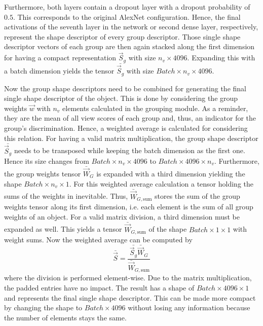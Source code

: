 Furthermore, both layers contain a dropout layer with a dropout probability of $0.5$.
This corresponds to the original AlexNet configuration.
Hence, the final activations of the seventh layer in the network or second dense layer, respectively, represent the shape descriptor of every group descriptor.
Those single shape descriptor vectors of each group are then again stacked along the first dimension for having a compact representation $\vec{S}_g$ with size $n_v \times 4096$.
Expanding this with a batch dimension yields the tensor $\bar{\vec{S}_g}$ with size $Batch \times n_v \times 4096$.

Now the group shape descriptors need to be combined for generating the final single shape descriptor of the object.
This is done by considering the group weights $\vec{w}$ with $n_v$ elements calculated in the grouping module.
As a reminder, they are the mean of all view scores of each group and, thus, an indicator for the group's discrimination.
Hence, a weighted average is calculated for considering this relation.
For having a valid matrix multiplication, the group shape descriptor $\bar{\vec{S}_g}$ needs to be transposed while keeping the batch dimension as the first one.
Hence its size changes from $Batch \times n_v \times 4096$ to $Batch \times 4096 \times n_v$.
Furthermore, the group weights tensor $\bar{\vec{W}}_G$ is expanded with a third dimension yielding the shape $Batch \times n_v \times 1$.
For this weighted average calculation a tensor holding the sums of the weights in inevitable.
Thus, $\bar{\vec{W}}_{G,\text{sum}}$ stores the sum of the group weights tensor along its first dimension, i.e. each element is the sum of all group weights of an object.
For a valid matrix division, a third dimension must be expanded as well.
This yields a tensor $\bar{\vec{W}}_{G,\text{sum}}$ of the shape $Batch \times 1 \times 1$ with weight sums.
Now the weighted average can be computed by
\begin{equation}
	\bar{\vec{S}} = \frac{\bar{\vec{S}_g} \bar{\vec{W}}_G} {\bar{\vec{W}}_{G,\text{sum}}}
\end{equation}
where the division is performed element-wise.
Due to the matrix multiplication, the padded entries have no impact.
The result has a shape of $Batch \times 4096 \times 1$ and represents the final single shape descriptor.
This can be made more compact by changing the shape to $Batch \times 4096$ without losing any information because the number of elements stays the same.

